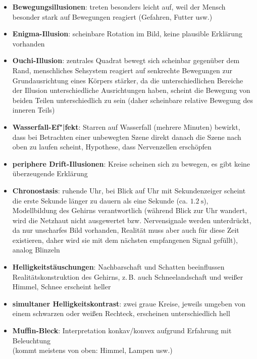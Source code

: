 \linie
\begin{itemize}
    \item
    \textbf{Bewegungsillusionen}:
    treten besonders leicht auf, weil der Mensch besonder stark auf
    Bewegungen reagiert (Gefahren, Futter usw.)

    \item
    \textbf{Enigma-Illusion}:
    scheinbare Rotation im Bild,
    keine plausible Erklärung vorhanden

    \item
    \textbf{Ouchi-Illusion}:
    zentrales Quadrat bewegt sich scheinbar gegenüber dem Rand,
    menschliches Sehsystem reagiert auf senkrechte Bewegungen zur
    Grundausrichtung eines Körpers stärker, da die unterschiedlichen
    Bereiche der Illusion unterschiedliche Ausrichtungen haben,
    scheint die Bewegung von beiden Teilen unterschiedlich zu sein
    (daher scheinbare relative Bewegung des inneren Teils)

    \item
    \textbf{Wasserfall-Ef"|fekt}:
    Starren auf Wasserfall (mehrere Minuten) bewirkt, dass bei Betrachten
    einer unbewegten Szene direkt danach die Szene nach oben zu laufen scheint,
    Hypothese, dass Nervenzellen erschöpfen

    \item
    \textbf{periphere Drift-Illusionen}:
    Kreise scheinen sich zu bewegen, es gibt keine überzeugende Erklärung

    \item
    \textbf{Chronostasis}:
    ruhende Uhr, bei Blick auf Uhr mit Sekundenzeiger scheint die erste
    Sekunde länger zu dauern als eine Sekunde (ca. $\SI{1.2}{\second}$),
    Modellbildung des Gehirns verantwortlich
    (während Blick zur Uhr wandert, wird die Netzhaut nicht ausgewertet bzw.
    Nervensignale werden unterdrückt, da nur unscharfes Bild vorhanden,
    Realität muss aber auch für diese Zeit existieren, daher wird sie
    mit dem nächsten empfangenen Signal gefüllt),
    analog Blinzeln
\end{itemize}
\linie
\pagebreak
\begin{itemize}
    \item
    \textbf{Helligkeitstäuschungen}:
    Nachbarschaft und Schatten beeinflussen Realitätskonstruktion des Gehirns,
    z.\,B. auch Schneelandschaft und weißer Himmel,
    Schnee erscheint heller

    \item
    \textbf{simultaner Helligkeitskontrast}:
    zwei graue Kreise, jeweils umgeben von einem schwarzen oder weißen
    Rechteck, erscheinen unterschiedlich hell

    \item
    \textbf{Muffin-Bleck}:
    Interpretation konkav/konvex aufgrund Erfahrung mit Beleuchtung \\
    (kommt meistens von oben: Himmel, Lampen usw.)
\end{itemize}
